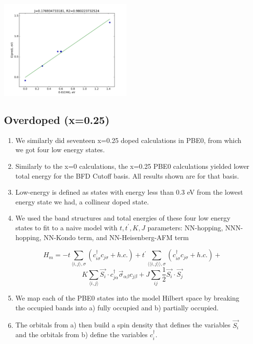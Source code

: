 \documentclass{article}
\begin{document}
\includegraphics[width=0.5\textwidth]{../undoped/PBE0_8/J_fit_naive.pdf}

\subsection{Overdoped (x=0.25)}
\begin{enumerate}
\item We similarly did seventeen x=0.25 doped calculations in PBE0, from which we got four low energy states. 

\item Similarly to the x=0 calculations, the x=0.25 PBE0 calculations yielded lower total energy for the BFD Cutoff basis. All results shown are for that basis.

\item Low-energy is defined as states with energy less than 0.3 eV from the lowest energy state we had, a collinear doped state.

\item We used the band structures and total energies of these four low energy states to fit to a naive model with $t, t^\prime, K, J$ parameters: NN-hopping, NNN-hopping, NN-Kondo term, and NN-Heisenberg-AFM term

$$H_m =  -t\sum_{\langle i, j \rangle, \sigma} (c_{i\sigma} ^\dagger c_{j\sigma} + h.c.) + 
t^\prime\sum_{\langle\langle i, j \rangle\rangle, \sigma} (c_{i\sigma} ^\dagger c_{j\sigma} + h.c.) + $$ 
$$K \sum_{\langle i, j \rangle} \vec{S_i} \cdot c_{j\alpha}^\dagger \vec{\sigma}_{\alpha \beta} c_{j\beta} + J\sum_{ij} \frac{1}{2} \vec{S_i}\cdot\vec{S_j} $$ 

\item We map each of the PBE0 states into the model Hilbert space by breaking the occupied bands into a) fully occupied and b) partially occupied. 

\item The orbitals from a) then build a spin density that defines the variables $\vec{S_i}$ and the orbitals from b) define the variables $c_i^\dagger$.


\end{enumerate}
\end{document}
